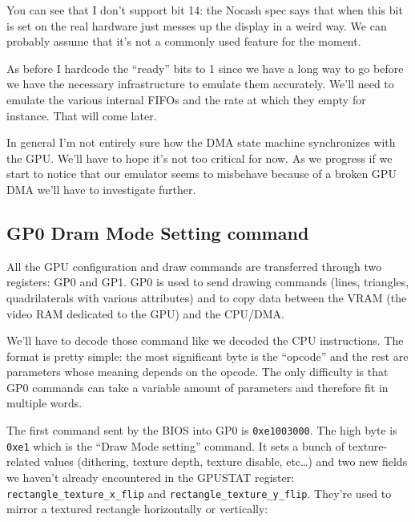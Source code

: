 \documentclass[a4paper]{article}
\newcommand{\code}[1] {\texttt{#1}}
\begin{document}
You can see that I don't support bit 14: the Nocash spec says that
when this bit is set on the real hardware just messes up the display
in a weird way. We can probably assume that it's not a commonly used
feature for the moment.

As before I hardcode the ``ready'' bits to 1 since we have a long way
to go before we have the necessary infrastructure to emulate them
accurately. We'll need to emulate the various internal FIFOs and the
rate at which they empty for instance. That will come later.

In general I'm not entirely sure how the DMA state machine
synchronizes with the GPU. We'll have to hope it's not too critical
for now. As we progress if we start to notice that our emulator seems
to misbehave because of a broken GPU DMA we'll have to investigate
further.

\subsection{GP0 Dram Mode Setting command}

All the GPU configuration and draw commands are transferred through
two registers: GP0 and GP1. GP0 is used to send drawing commands
(lines, triangles, quadrilaterals with various attributes) and to copy
data between the VRAM (the video RAM dedicated to the GPU) and the
CPU/DMA.

We'll have to decode those command like we decoded the CPU
instructions. The format is pretty simple: the most significant byte
is the ``opcode'' and the rest are parameters whose meaning depends on
the opcode. The only difficulty is that GP0 commands can take a
variable amount of parameters and therefore fit in multiple words.

The first command sent by the BIOS into GP0 is \code{0xe1003000}. The
high byte is \code{0xe1} which is the ``Draw Mode setting''
command. It sets a bunch of texture-related values (dithering, texture
depth, texture disable, etc\dots{}) and two new fields we haven't
already encountered in the GPUSTAT register:
\code{rectangle\_texture\_x\_flip} and
\code{rectangle\_texture\_y\_flip}. They're used to mirror a textured
rectangle horizontally or vertically:
\end{document}
